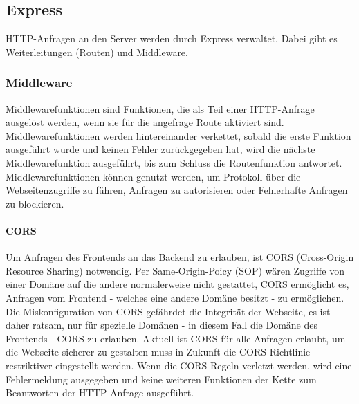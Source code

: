 \subsection{Express}
HTTP-Anfragen an den Server werden durch Express verwaltet. Dabei gibt es Weiterleitungen (Routen) und Middleware.

\subsubsection{Middleware}
Middlewarefunktionen sind Funktionen, die als Teil einer HTTP-Anfrage ausgelöst werden, wenn sie für die angefrage Route aktiviert sind. Middlewarefunktionen werden hintereinander verkettet, sobald die erste Funktion ausgeführt wurde und keinen Fehler zurückgegeben hat, wird die nächste Middlewarefunktion ausgeführt, bis zum Schluss die Routenfunktion antwortet. Middlewarefunktionen können genutzt werden, um Protokoll über die Webseitenzugriffe zu führen, Anfragen zu autorisieren oder Fehlerhafte Anfragen zu blockieren.

\paragraph{CORS\\}
Um Anfragen des Frontends an das Backend zu erlauben, ist CORS (Cross-Origin Resource Sharing) notwendig. Per Same-Origin-Poicy (SOP) wären Zugriffe von einer Domäne auf die andere normalerweise nicht gestattet, CORS ermöglicht es, Anfragen vom Frontend - welches eine andere Domäne besitzt - zu ermöglichen. Die Miskonfiguration von CORS gefährdet die Integrität der Webseite, es ist daher ratsam, nur für spezielle Domänen - in diesem Fall die Domäne des Frontends - CORS zu erlauben. Aktuell ist CORS für alle Anfragen erlaubt, um die Webseite sicherer zu gestalten muss in Zukunft die CORS-Richtlinie restriktiver eingestellt werden. Wenn die CORS-Regeln verletzt werden, wird eine Fehlermeldung ausgegeben und keine weiteren Funktionen der Kette zum Beantworten der HTTP-Anfrage ausgeführt.

